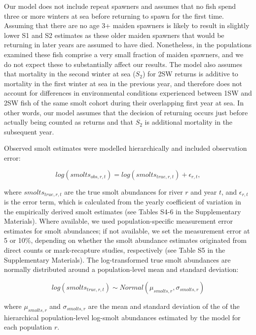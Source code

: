 \documentclass[12pt]{article}
\newcommand{\St}{$S_{2}$\xspace}
\newcommand{\comment}[1]{\par {\bfseries \color{blue} #1 \par}} %
\begin{document}
Our model does not include repeat spawners and assumes that no fish spend
three or more winters at sea before returning to spawn for the first time.
Assuming that there are no age 3+ maiden spawners is likely to result in
slightly lower S1 and S2 estimates as these older maiden spawners that would
be returning in later years are assumed to have died. Nonetheless, in the
populations examined these fish comprise a very small fraction of maiden spawners,
and we do not expect these to substantially affect our results.
The model also assumes that mortality in the second winter at sea (\St) for 2SW returns
is additive to mortality in the first winter at sea in the previous year,
and therefore does not account for differences in environmental conditions experienced
between 1SW and 2SW fish of the same smolt cohort during their overlapping first year at sea.
In other words, our model assumes that the decision of returning occurs just before
actually being counted as returns and that \St is additional mortality in
the subsequent year.


Observed smolt estimates were modelled hierarchically and included
observation error:

\begin{equation}
log(smolts_{obs,r,t}) = log(smolts_{true,r,t}) + \epsilon_{r,t},
\end{equation}

where $smolts_{true,r,t}$ are the true smolt abundances for river
$r$ and year $t$, and $\epsilon_{r,t}$ is the error term, which is calculated from the yearly
coefficient of variation in the empirically derived
smolt estimates (see Tables S4-6 in the Supplementary Materials).
Where available, we used population-specific measurement error estimates for smolt abundances; if not
available, we set the measurement error at 5 or 10\%, depending on whether the smolt
abundance estimates originated from direct counts or mark-recapture studies, respectively
(see Table S5 in the Supplementary Materials).
The log-transformed true smolt abundances are
normally distributed around a population-level mean and standard deviation:

\begin{equation}
log(smolts_{true,r,t}) \sim Normal(\mu_{smolts,r}, \sigma_{smolts,r})
\end{equation}

where $\mu_{smolts,r}$ and $\sigma_{smolts,r}$ are the mean and standard
deviation of the of the hierarchical population-level log-smolt abundances
estimated by the model for each population $r$.
\end{document}
